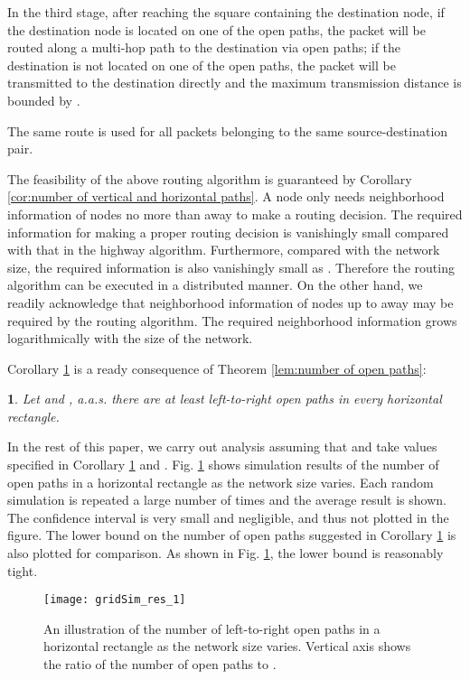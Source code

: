 \documentclass[english]{IEEEtran}
\theoremstyle{plain}
\theoremstyle{plain}
\newtheorem{cor}[thm]{\protect\corollaryname}
\theoremstyle{plain}
\theoremstyle{remark}
\providecommand{\corollaryname}{Corollary}
\begin{document}
In the third stage, after reaching the square containing the destination
node, if the destination node is located on one of the open paths,
the packet will be routed along a multi-hop path to the destination
via open paths; if the destination is not located on one of the open
paths, the packet will be transmitted to the destination directly
and the maximum transmission distance is bounded by . 

The same route is used for all packets belonging to the same source-destination
pair.

The feasibility of the above routing algorithm is guaranteed by Corollary
\ref{cor:number of vertical and horizontal paths}. A node only needs
neighborhood information of nodes no more than 
away to make a routing decision. The required information for making
a proper routing decision is vanishingly small compared with that
in the highway algorithm. Furthermore, compared with the network size,
the required information is also vanishingly small as .
Therefore the routing algorithm can be executed in a distributed manner.\textbf{
}On the other hand, we readily acknowledge that neighborhood information
of nodes up to  away\textbf{ }may be required
by the routing algorithm.\textbf{ }The required neighborhood information
grows logarithmically with the size of the network.

Corollary \ref{cor:Number-Open-Paths} is a ready consequence of Theorem
\ref{lem:number of open paths}:
\begin{cor}
\label{cor:Number-Open-Paths}Let  and , a.a.s.
there are at least  left-to-right open paths in every
horizontal rectangle.
\end{cor}
In the rest of this paper, we carry out analysis assuming that 
and  take values specified in Corollary \ref{cor:Number-Open-Paths}
and . Fig. \ref{fig:number of open paths} shows
simulation results of the number of open paths in a horizontal rectangle
as the network size  varies. Each random simulation is repeated
a large number of times and the average result is shown. The confidence
interval is very small and negligible, and thus not plotted in the
figure. The lower bound on the number of open paths suggested in Corollary
\ref{cor:Number-Open-Paths} is also plotted for comparison. As shown
in Fig. \ref{fig:number of open paths}, the lower bound is reasonably
tight. 

\begin{figure}
\begin{centering}
\texttt{[image: gridSim\_res\_1]}
\par\end{centering}

\protect\caption{\label{fig:number of open paths}An illustration of the number of
left-to-right open paths in a horizontal rectangle as the network
size varies. Vertical axis shows the ratio of the number of open paths
to .}
\end{figure}
\end{document}
